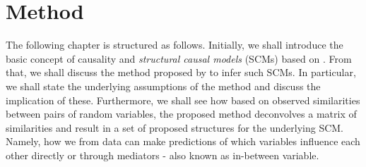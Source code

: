\documentclass[../Thesis.tex]{subfiles}
\begin{document}








\chapter{Method}\label{chap:method}
The following chapter is structured as follows. Initially, we shall introduce the basic concept of causality and \textit{structural causal models} (SCMs) based on \cite{Elements_of_Causal_Inference:_Foundations_and_Learning_Algorithms}. From that, we shall discuss the method proposed by \cite{Network-deconvolution-as-a-general-method-to-distinguish-direct-dependencies-in-networks} to infer such SCMs. In particular, we shall state the underlying assumptions of the method and discuss the implication of these. Furthermore, we shall see how based on observed similarities between pairs of random variables, the proposed method deconvolves a matrix of similarities and result in a set of proposed structures for the underlying SCM. Namely, how we from data can make predictions of which variables influence each other directly or through mediators - also known as in-between variable.
\end{document}
